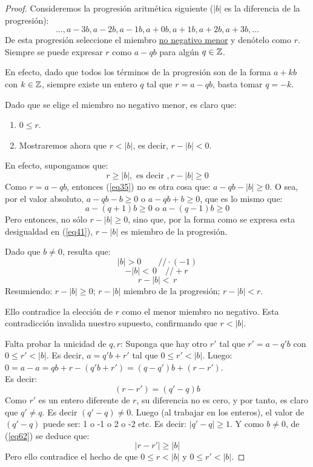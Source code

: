 \begin{proof}
Consideremos la progresión aritmética siguiente ($|b|$ es
la diferencia de la progresión):
\[ \ldots, a-3b, a-2b, a-1b, a+0b, a+1b, a+2b, a+3b, \ldots \]
De esta progresión seleccione el miembro \underline{no negativo menor} y denótelo como $r$. 
Siempre se puede expresar $r$ como $a-qb$ para algún $q \in \mathbb{Z}$.

En efecto, dado que todos los términos de la progresión son de la forma $a+kb$ con $k \in \mathbb{Z}$, siempre existe un entero $q$ tal que $r = a-qb$, basta tomar $q = -k$. 

Dado que se elige el miembro no negativo menor, es claro que: 
\begin{enumerate}[label=(\roman*)]
    \item $0 \leq r$.
    \item Mostraremos ahora que $r < |b|$, es decir, $r-|b| < 0$. 
\end{enumerate}

En efecto, supongamos que:
\begin{equation}
\label{eq35}
    r \geq |b|, \text{ es decir }, r -|b| \geq 0
\end{equation}
Como $r = a-qb$, entonces (\ref{eq35})  no es otra cosa que: $a-qb -|b| \geq 0$. 
O sea, por el valor absoluto, $a-qb - b \geq 0$ o $a-qb + b \geq 0$, que es lo mismo que:
\begin{equation}
    \label{eq41}
    a-(q+1)b \geq 0 \text{ o } a-(q-1)b \geq 0
\end{equation}
Pero entonces, no sólo $r - |b| \geq 0$, sino que, por la forma como se expresa esta desigualdad en (\ref{eq41}), $r - |b|$ es miembro de la progresión. 

Dado que $b \neq 0$, resulta que: 
\[|b| > 0 \qquad // \cdot(-1) \]
\[ -|b| < \, 0 \quad // +r \ \]
\[ r-|b| < \, r \]
Resumiendo: $r - |b| \geq 0$; $r - |b|$ miembro de la progresión; $r - |b| < r$. 

Ello contradice la elección de $r$ como el menor miembro no negativo.
Esta contradicción invalida nuestro supuesto, confirmando que
$r < |b|$. 

Falta probar la unicidad de $q,r$: 
Suponga que hay otro $r'$ tal que $r' = a-q'b$ con $0 \leq r' < |b|$. 
Es decir, $a = q'b + r'$ tal que $0 \leq r' < |b|$. 
Luego: $0 = a - a = qb + r - (q'b + r') = (q-q')b + (r-r')$.\\
Es decir: 
\begin{equation}
    \label{eq62}
    (r-r') = (q'-q)b
\end{equation}
Como $r'$ es un entero diferente de $r$, su diferencia no es cero, y por tanto, es claro que $q' \neq q$. Es decir $(q'-q) \neq 0$.
Luego (al trabajar en los enteros), el valor de $(q' - q)$ puede ser: 1 o -1 o 2 o -2 etc.
Es decir: $|q' - q| \geq 1$. Y como $b \neq 0$, de (\ref{eq62}) se deduce que: 
\begin{equation}
    \label{eq69}
    |r - r'| \geq |b|
\end{equation}
Pero ello contradice el hecho de que $0 \leq r < |b|$ y $0 \leq r' < |b|$. 


\end{proof}
